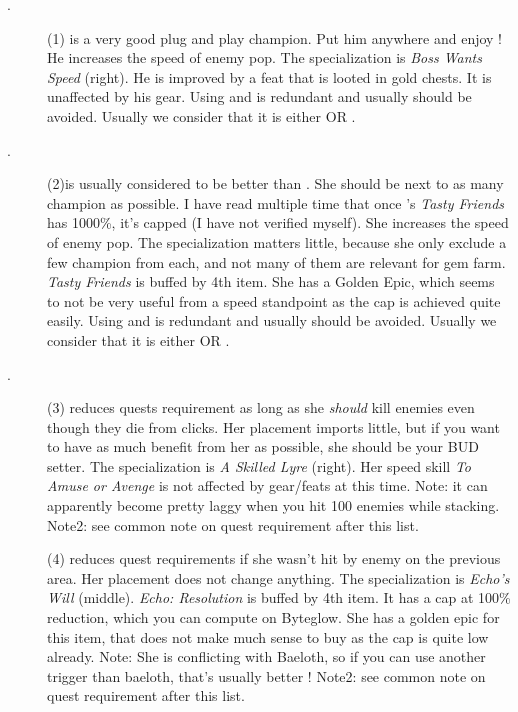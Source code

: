 \documentclass{article}
\begin{document}
\begin{description}
    \item[\deekin.] (1) \deekin is a very good plug and play champion.
    Put him anywhere and enjoy !
    He increases the speed of enemy pop.
    The specialization is \textit{Boss Wants Speed} (right).
    He is improved by a feat that is looted in gold chests.
    It is unaffected by his gear.
    Using \deekin and \widdle is redundant and usually should be avoided.
    Usually we consider that it is either \deekin OR \widdle.
    
    \item[\widdle.] (2)\widdle is usually considered to be better than \deekin.
    She should be next to as many champion as possible.
    I have read multiple time that once \widdle's \textit{Tasty Friends} has 1000\%, it's capped (I have not verified myself).
    She increases the speed of enemy pop.
    The specialization matters little, because she only exclude a few champion from each, and not many of them are relevant for gem farm.
    \textit{Tasty Friends} is buffed by \widdle 4th item.
    She has a Golden Epic, which seems to not be very useful from a speed standpoint as the cap is achieved quite easily.
    Using \deekin and \widdle is redundant and usually should be avoided.
    Usually we consider that it is either \deekin OR \widdle.
    
    \item[\nahara.] (3) \nahara reduces quests requirement as long as she \textit{should} kill enemies even though they die from clicks.
    Her placement imports little, but if you want to have as much benefit from her as possible, she should be your BUD setter.
    The specialization is \textit{A Skilled Lyre} (right).
    Her speed skill \textit{To Amuse or Avenge} is not affected by gear/feats at this time.
    Note: it can apparently become pretty laggy when you hit 100 enemies while stacking.
    Note2: see common note on quest requirement after this list.
    
    \item[\sentry] (4) \sentry reduces quest requirements if she wasn't hit by enemy on the previous area.
    Her placement does not change anything.
    The specialization is \textit{Echo's Will} (middle).
    \textit{Echo: Resolution} is buffed by \sentry 4th item.
    It has a cap at 100\% reduction, which you can compute on Byteglow.
    She has a golden epic for this item, that does not make much sense to buy as the cap is quite low already.
    Note: She is conflicting with Baeloth, so if you can use another trigger than baeloth, that's usually better !
    Note2: see common note on quest requirement after this list.
    

\end{description}
\end{document}
